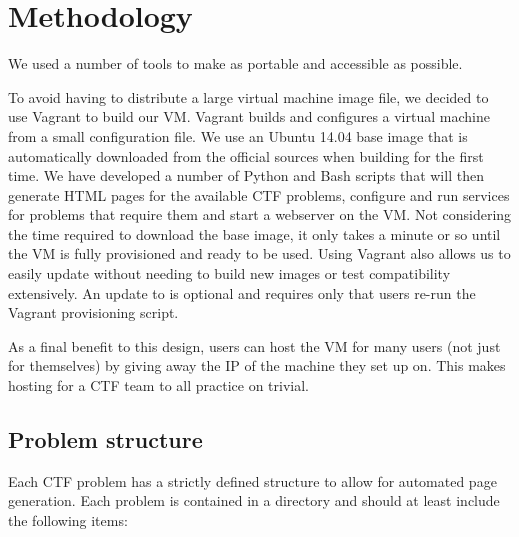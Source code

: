 \section{Methodology}
\label{sec:methodology}
We used a number of tools to make \cvm{} as portable and accessible as
possible.

To avoid having to distribute a large virtual machine image file, we
decided to use Vagrant to build our VM. Vagrant builds and configures
a virtual machine from a small configuration file. We use an Ubuntu
14.04 base image that is automatically downloaded from the official
sources when building \cvm{} for the first time. We have developed a
number of Python and Bash scripts that will then generate HTML pages
for the available CTF problems, configure and run services for
problems that require them and start a webserver on the VM. Not
considering the time required to download the base image, it only
takes a minute or so until the VM is fully provisioned and ready to be
used. Using Vagrant also allows us to easily update \cvm{} without
needing to build new images or test compatibility extensively. An
update to \cvm{} is optional and requires only that users re-run the
Vagrant provisioning script.

As a final benefit to this design, users can host the VM for many
users (not just for themselves) by giving away the IP of the machine
they set \cvm{} up on. This makes hosting \cvm{} for a CTF team to all
practice on trivial.

\subsection{Problem structure}
Each CTF problem has a strictly defined structure to allow for
automated page generation. Each problem is contained in a directory
and should at least include the following items:

